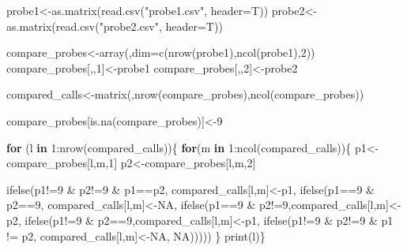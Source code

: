 \documentclass[
]{article}
\newenvironment{Shaded}{\begin{snugshade}}{\end{snugshade}}
\newcommand{\AttributeTok}[1]{\textcolor[rgb]{0.77,0.63,0.00}{#1}}
\newcommand{\ConstantTok}[1]{\textcolor[rgb]{0.00,0.00,0.00}{#1}}
\newcommand{\ControlFlowTok}[1]{\textcolor[rgb]{0.13,0.29,0.53}{\textbf{#1}}}
\newcommand{\DecValTok}[1]{\textcolor[rgb]{0.00,0.00,0.81}{#1}}
\newcommand{\FunctionTok}[1]{\textcolor[rgb]{0.00,0.00,0.00}{#1}}
\newcommand{\NormalTok}[1]{#1}
\newcommand{\OtherTok}[1]{\textcolor[rgb]{0.56,0.35,0.01}{#1}}
\newcommand{\SpecialCharTok}[1]{\textcolor[rgb]{0.00,0.00,0.00}{#1}}
\newcommand{\StringTok}[1]{\textcolor[rgb]{0.31,0.60,0.02}{#1}}
\begin{document}
\begin{Shaded}
\begin{Highlighting}[]
\NormalTok{probe1}\OtherTok{\textless{}{-}}\FunctionTok{as.matrix}\NormalTok{(}\FunctionTok{read.csv}\NormalTok{(}\StringTok{"probe1.csv"}\NormalTok{, }\AttributeTok{header=}\NormalTok{T))}
\NormalTok{probe2}\OtherTok{\textless{}{-}}\FunctionTok{as.matrix}\NormalTok{(}\FunctionTok{read.csv}\NormalTok{(}\StringTok{"probe2.csv"}\NormalTok{, }\AttributeTok{header=}\NormalTok{T))}

\NormalTok{compare\_probes}\OtherTok{\textless{}{-}}\FunctionTok{array}\NormalTok{(,}\AttributeTok{dim=}\FunctionTok{c}\NormalTok{(}\FunctionTok{nrow}\NormalTok{(probe1),}\FunctionTok{ncol}\NormalTok{(probe1),}\DecValTok{2}\NormalTok{))}
\NormalTok{compare\_probes[,,}\DecValTok{1}\NormalTok{]}\OtherTok{\textless{}{-}}\NormalTok{probe1}
\NormalTok{compare\_probes[,,}\DecValTok{2}\NormalTok{]}\OtherTok{\textless{}{-}}\NormalTok{probe2}

\NormalTok{compared\_calls}\OtherTok{\textless{}{-}}\FunctionTok{matrix}\NormalTok{(,}\FunctionTok{nrow}\NormalTok{(compare\_probes),}\FunctionTok{ncol}\NormalTok{(compare\_probes))}

\NormalTok{compare\_probes[}\FunctionTok{is.na}\NormalTok{(compare\_probes)]}\OtherTok{\textless{}{-}}\DecValTok{9}

\ControlFlowTok{for}\NormalTok{ (l }\ControlFlowTok{in} \DecValTok{1}\SpecialCharTok{:}\FunctionTok{nrow}\NormalTok{(compared\_calls))\{}
  \ControlFlowTok{for}\NormalTok{(m }\ControlFlowTok{in} \DecValTok{1}\SpecialCharTok{:}\FunctionTok{ncol}\NormalTok{(compared\_calls))\{}
\NormalTok{    p1}\OtherTok{\textless{}{-}}\NormalTok{compare\_probes[l,m,}\DecValTok{1}\NormalTok{]}
\NormalTok{    p2}\OtherTok{\textless{}{-}}\NormalTok{compare\_probes[l,m,}\DecValTok{2}\NormalTok{]}
    
    \FunctionTok{ifelse}\NormalTok{(p1}\SpecialCharTok{!=}\DecValTok{9} \SpecialCharTok{\&}\NormalTok{ p2}\SpecialCharTok{!=}\DecValTok{9} \SpecialCharTok{\&}\NormalTok{ p1}\SpecialCharTok{==}\NormalTok{p2, compared\_calls[l,m]}\OtherTok{\textless{}{-}}\NormalTok{p1,}
           \FunctionTok{ifelse}\NormalTok{(p1}\SpecialCharTok{==}\DecValTok{9} \SpecialCharTok{\&}\NormalTok{ p2}\SpecialCharTok{==}\DecValTok{9}\NormalTok{, compared\_calls[l,m]}\OtherTok{\textless{}{-}}\ConstantTok{NA}\NormalTok{,       }
                  \FunctionTok{ifelse}\NormalTok{(p1}\SpecialCharTok{==}\DecValTok{9} \SpecialCharTok{\&}\NormalTok{ p2}\SpecialCharTok{!=}\DecValTok{9}\NormalTok{,compared\_calls[l,m]}\OtherTok{\textless{}{-}}\NormalTok{p2,       }
                         \FunctionTok{ifelse}\NormalTok{(p1}\SpecialCharTok{!=}\DecValTok{9} \SpecialCharTok{\&}\NormalTok{ p2}\SpecialCharTok{==}\DecValTok{9}\NormalTok{,compared\_calls[l,m]}\OtherTok{\textless{}{-}}\NormalTok{p1,              }
                                \FunctionTok{ifelse}\NormalTok{(p1}\SpecialCharTok{!=}\DecValTok{9} \SpecialCharTok{\&}\NormalTok{ p2}\SpecialCharTok{!=}\DecValTok{9} \SpecialCharTok{\&}\NormalTok{ p1 }\SpecialCharTok{!=}\NormalTok{ p2, compared\_calls[l,m]}\OtherTok{\textless{}{-}}\ConstantTok{NA}\NormalTok{,                       }
                                       \ConstantTok{NA}\NormalTok{)))))   }
\NormalTok{  \} }
  \FunctionTok{print}\NormalTok{(l)\}}



\end{Highlighting}
\end{Shaded}
\end{document}
